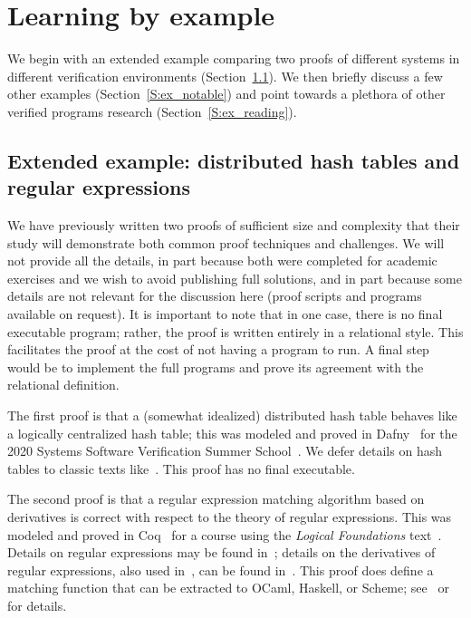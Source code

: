 \section{Learning by example}\label{S:examples}

We begin with an extended example comparing two proofs of different systems in
different verification environments (Section~\ref{S:ex_ext}). We then briefly
discuss a few other examples (Section~\ref{S:ex_notable}) and point towards a
plethora of other verified programs research (Section~\ref{S:ex_reading}).

\subsection{Extended example: distributed hash tables and regular
expressions}\label{S:ex_ext}

We have previously written two proofs of sufficient size and complexity that
their study will demonstrate both common proof techniques and challenges. We will
not provide all the details, in part because both were completed for academic
exercises and we wish to avoid publishing full solutions, and in part because
some details are not relevant for the discussion here (proof scripts and
programs available on request). It is important to note that in one case, there
is no final executable program; rather, the proof is written entirely in a
relational style. This facilitates the proof at the cost of not having a program
to run. A final step would be to implement the full programs and prove its
agreement with the relational definition.

The first proof is that a (somewhat idealized) distributed hash table behaves
like a logically centralized hash table; this was modeled and proved in
Dafny~\cite{leino2010dafny} for the 2020 Systems Software Verification Summer
School~\cite{Kapritsos_2020}. We defer details on hash tables to classic texts
like~\cite{CLRS}. This proof has no final executable.

The second proof is that a regular expression matching algorithm based on
derivatives is correct with respect to the theory of regular expressions. This
was modeled and proved in Coq~\cite{Coq} for a course using the \emph{Logical
Foundations} text~\cite{Pierce:SF1}. Details on regular expressions may be found
in~\cite{Lewis_1997,Morrisett_2012}; details on the derivatives of regular
expressions, also used in~\cite{Pierce:SF1,Morrisett_2012}, can be found
in~\cite{Might_Yacc,Might_desugar,Might_deriv}. This proof does define a
matching function that can be extracted to OCaml, Haskell, or Scheme;
see~\cite{Coq_Extract} or~\cite[Ch.\ \emph{Extraction}]{Pierce:SF1} for details.

